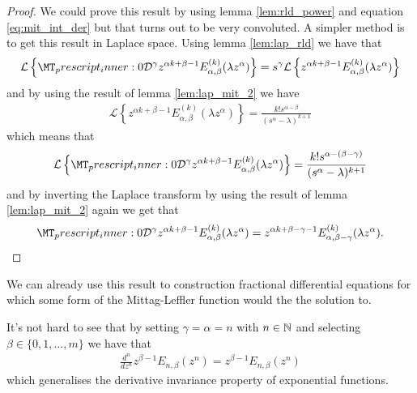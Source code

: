 \begin{proof}
    We could prove this result by using lemma \ref{lem:rld_power} and equation \eqref{eq:mit_int_der} but that turns out to be very convoluted. A simpler method is to get this result in Laplace space.
    Using lemma \ref{lem:lap_rld} we have that 
    \begin{align}
        \mathcal{L}\left\{ \prescript{}{0}{\mathcal{D}}^\gamma z^{\alpha k+\beta-1}E_{\alpha,\beta}^{(k)}(\lambda z^\alpha) \right\} = s^\gamma \mathcal{L}\left\{z^{\alpha k+\beta-1}E_{\alpha,\beta}^{(k)}(\lambda z^\alpha) \right\}
    \end{align}
    and by using the result of lemma \ref{lem:lap_mit_2} we have
    \begin{align}
        \mathcal{L}\left\{z^{\alpha k+\beta-1}E_{\alpha,\beta}^{(k)}(\lambda z^\alpha) \right\} = \frac{k!s^{\alpha - \beta}}{(s^\alpha - \lambda)^{k+1}}
    \end{align}
    which means that
    \begin{align}
        \mathcal{L}\left\{ \prescript{}{0}{\mathcal{D}}^\gamma z^{\alpha k+\beta-1}E_{\alpha,\beta}^{(k)}(\lambda z^\alpha) \right\} = \frac{k!s^{\alpha - (\beta - \gamma)}}{(s^\alpha - \lambda)^{k+1}}
    \end{align}
    and by inverting the Laplace transform by using the result of lemma \ref{lem:lap_mit_2} again we get that
    \begin{align}
        \prescript{}{0}{\mathcal{D}}^\gamma z^{\alpha k+\beta-1}E_{\alpha,\beta}^{(k)}(\lambda z^\alpha) = z^{\alpha k + \beta - \gamma - 1 } E_{\alpha,\beta-\gamma}^{(k)}(\lambda z^\alpha).
    \end{align}
\end{proof}
We can already use this result to construction fractional differential equations for which some form of the Mittag-Leffler function would the the solution to. 

It's not hard to see that by setting $ \gamma = \alpha = n $ with $ n \in \mathbb{N} $ and selecting $ \beta \in \{ 0 , 1, \ldots, m\} $ we have that
\begin{align}
    \frac{d^n}{dz^n} z^{\beta - 1} E_{n,\beta}(z^n) = z^{\beta - 1}E_{n,\beta}(z^n)
\end{align}
which generalises the derivative invariance property of exponential functions.

